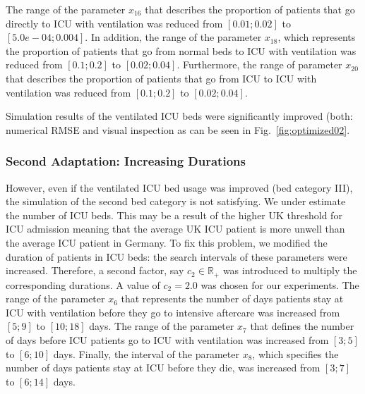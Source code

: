 \documentclass[conference]{IEEEtran}
\begin{document}
The range of the parameter 
$x_{16}$ that describes the proportion of patients that go directly to ICU with ventilation 
was reduced from $[0.01; 0.02]$ to $[5.0e-04; 0.004]$. In addition, the range of the parameter $x_{18}$, which represents the proportion of patients that go from normal beds to ICU with ventilation was reduced from $[0.1; 0.2]$ to $[0.02; 0.04]$. Furthermore, 
the range of parameter $x_{20}$ that describes the proportion of patients that go from ICU to ICU with ventilation was reduced from $[0.1; 0.2]$ to $[0.02; 0.04]$. 

Simulation results of the ventilated ICU beds were significantly improved (both: numerical RMSE and visual inspection as can be seen in Fig.~\ref{fig:optimized02}.

\subsubsection{Second Adaptation: Increasing Durations}

However, even if the ventilated ICU bed usage was improved (bed category III), the simulation of the second bed category is not satisfying. We under estimate the number of ICU beds. This may be a result of the higher UK threshold for ICU admission meaning that the average UK ICU patient is more unwell than the average ICU patient in Germany. To fix this problem, we modified the duration of patients in ICU beds: the search intervals of these parameters were increased. Therefore, a second factor, say $c_2 \in \mathbb{R}_+$ was introduced to multiply the corresponding durations. A value of $c_2 = 2.0$ was chosen for our experiments.
The range of the parameter  $x_{6}$ that represents the number of days  patients stay at ICU with ventilation before they go to intensive aftercare was increased from $[5;9]$ to $[10;18]$ days. The range of the
parameter $x_{7}$  that defines the  number of days before ICU  patients go to ICU with ventilation was increased from $[3;5]$ to $[6;10]$ days. Finally, the interval of the parameter $x_{8}$, which specifies the number of days patients stay at ICU before they die, was increased from $[3;7]$ to $[6;14]$ days.
\end{document}
